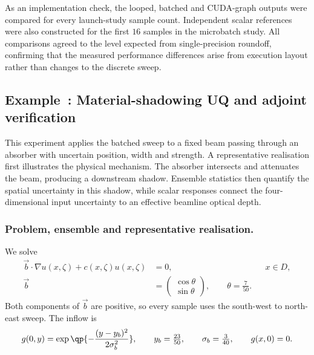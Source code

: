 \documentclass[final]{amsart}
\newcounter{numexample}
\newcommand{\CurrentExample}{Example~\thenumexample}
\newcommand{\ExampleSubsection}[2]{%
  \refstepcounter{numexample}%
  \label{#2-exno}%
  \subsection{\CurrentExample: #1}%
  \label{#2}%
}
\begin{document}
As an implementation check, the looped, batched and CUDA-graph outputs
were compared for every launch-study sample count. Independent scalar
references were also constructed for the first $16$ samples in the
microbatch study. All comparisons agreed to the level expected from
single-precision roundoff, confirming that the measured performance
differences arise from execution layout rather than changes to the
discrete sweep.

\FloatBarrier

\ExampleSubsection{Material-shadowing UQ and adjoint verification}
{subsec:material_shadowing}

This experiment applies the batched sweep to a fixed beam passing
through an absorber with uncertain position, width and strength. A
representative realisation first illustrates the physical
mechanism. The absorber intersects and attenuates the beam, producing
a downstream shadow. Ensemble statistics then quantify the spatial
uncertainty in this shadow, while scalar responses connect the
four-dimensional input uncertainty to an effective beamline optical
depth.

\subsubsection{Problem, ensemble and representative realisation.}

We solve
\begin{align}
\vec b\cdot\nabla u(x,\zeta)+c(x,\zeta)u(x,\zeta)
&=0,
&&x\in D,
\label{eq:shadow_transport}
\\
\vec b
&=
\begin{pmatrix}
\cos\theta\\
\sin\theta
\end{pmatrix},
\qquad
\theta=\tfrac{7}{50}.
\label{eq:shadow_direction}
\end{align}
Both components of $\vec b$ are positive, so every sample uses the
south-west to north-east sweep. The inflow is
\begin{equation}
g(0,y)
=
\exp\qp{
-\frac{(y-y_b)^2}{2\sigma_b^2}
},
\qquad
y_b=\tfrac{23}{50},
\qquad
\sigma_b=\tfrac{3}{40},
\qquad
g(x,0)=0.
\label{eq:shadow_inflow}
\end{equation}
\end{document}
